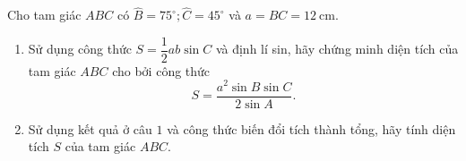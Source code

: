 \begin{bt}
\begin{bt}%
	Cho tam giác $A B C$ có $\widehat{B}=75^{\circ}; \widehat{C}=45^{\circ}$ và $a=B C=12 \mathrm{~cm}$.
	\begin{enumerate}
		\item Sử dụng công thức $S=\dfrac{1}{2} a b \sin C$ và định lí sin, hãy chứng minh diện tích của tam giác $A B C$ cho bởi công thức
		      $$
			      S=\dfrac{a^2 \sin B \sin C}{2 \sin A} .
		      $$
		\item Sử dụng kết quả ở câu $1$ và công thức biến đổi tích thành tổng, hãy tính diện tích $S$ của tam giác $A B C$.
	\end{enumerate}
\end{bt}


\end{bt}

